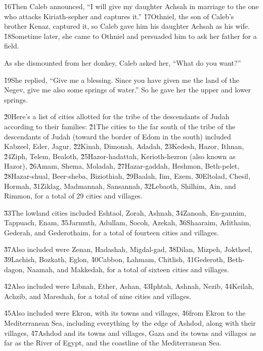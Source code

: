\v{16}Then Caleb announced, ``I will give my daughter Achsah in marriage to the one who attacks Kiriath-sepher and captures it.'' \v{17}Othniel, the son of Caleb's brother Kenaz, captured it, so Caleb gave him his daughter Achsah as his wife. \v{18}Sometime later, she came to Othniel and persuaded him to ask her father for a field.

As she dismounted from her donkey, Caleb asked her, ``What do you want?''

\v{19}She replied, ``Give me a blessing. Since you have given me the land of the Negev, give me also some springs of water.'' So he gave her the upper and lower springs.

\v{20}Here's a list of cities allotted for the tribe of the descendants of Judah according to their families: \v{21}The cities to the far south of the tribe of the descendants of Judah (toward the border of Edom in the south) included Kabzeel, Eder, Jagur, \v{22}Kinah, Dimonah, Adadah, \v{23}Kedesh, Hazor, Ithnan, \v{24}Ziph, Telem, Bealoth, \v{25}Hazor-hadattah, Kerioth-hezron (also known as Hazor), \v{26}Amam, Shema, Moladah, \v{27}Hazar-gaddah, Heshmon, Beth-pelet, \v{28}Hazar-shual, Beer-sheba, Biziothiah, \v{29}Baalah, Iim, Ezem, \v{30}Eltolad, Chesil, Hormah, \v{31}Ziklag, Madmannah, Sansannah, \v{32}Lebaoth, Shilhim, Ain, and Rimmon, for a total of 29 cities and villages.

\v{33}The lowland cities included Eshtaol, Zorah, Ashnah, \v{34}Zanoah, En-gannim, Tappuach, Enam, \v{35}Jarmuth, Adullam, Socoh, Azekah, \v{36}Shaaraim, Adithaim, Gederah, and Gederothaim, for a total of fourteen cities and villages.

\v{37}Also included were Zenan, Hadashah, Migdal-gad, \v{38}Dilan, Mizpeh, Joktheel, \v{39}Lachish, Bozkath, Eglon, \v{40}Cabbon, Lahmam, Chitlish, \v{41}Gederoth, Beth-dagon, Naamah, and Makkedah, for a total of sixteen cities and villages.

\v{42}Also included were Libnah, Ether, Ashan, \v{43}Iphtah, Ashnah, Nezib, \v{44}Keilah, Achzib, and Mareshah, for a total of nine cities and villages.

\v{45}Also included were Ekron, with its towns and villages, \v{46}from Ekron to the Mediterranean Sea, including everything by the edge of Ashdod, along with their villages, \v{47}Ashdod and its towns and villages, Gaza and its towns and villages as far as the River of Egypt, and the coastline of the Mediterranean Sea.

